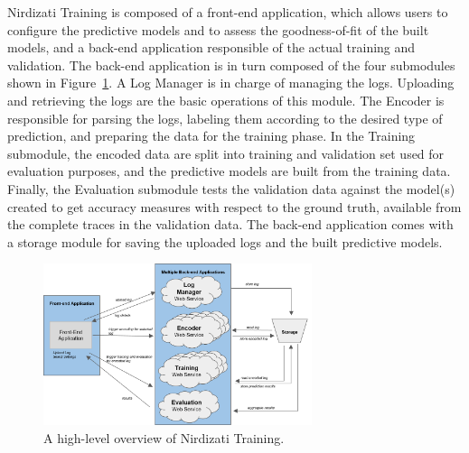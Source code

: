 \documentclass[runningheads,a4paper]{llncs}
\begin{document}
Nirdizati Training is composed of a front-end application, which allows users to configure the predictive models
and to assess the goodness-of-fit of the built models, and a back-end application responsible of the actual training and validation.
The back-end application is in turn composed of the four submodules shown in Figure~\ref{fig:nirdizati-training}.
A Log Manager is in charge of managing the logs. Uploading and retrieving the logs are the basic operations
of this module. The Encoder is responsible for parsing the logs, labeling them according to the desired type of prediction,
 and preparing the data for the training phase.
In the Training submodule, the encoded data are split into training and validation set used for evaluation purposes,
and the predictive models are built from the training data. Finally, the Evaluation submodule
tests the validation data against the model(s) created to get accuracy measures with respect to the ground truth,
available from the complete traces in the validation data.
The back-end application comes with a storage module for saving the uploaded logs and the built predictive models.


\begin{figure}[t]%
	\centering
	 \includegraphics[width=0.7\textwidth]{img/nirdizati-training-architecture-rev}
	\caption{A high-level overview of Nirdizati Training.}
	\label{fig:nirdizati-training}
	\vspace{-0.5\baselineskip}
\end{figure}
\end{document}
